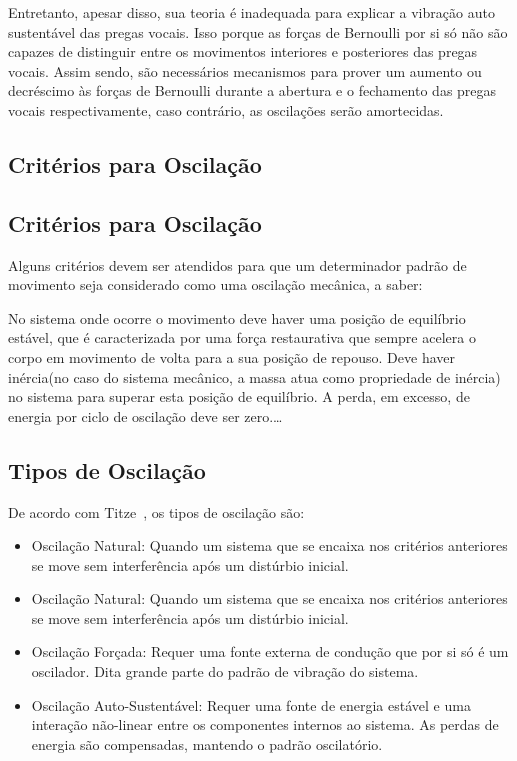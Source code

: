 	Entretanto, apesar disso, sua teoria é inadequada para explicar a vibração auto sustentável das pregas vocais. Isso porque as forças de Bernoulli por si só não são capazes de distinguir entre os movimentos interiores e posteriores das pregas vocais. Assim sendo, são necessários mecanismos para prover um aumento ou decréscimo às forças de Bernoulli durante a abertura e o fechamento das pregas vocais respectivamente, caso contrário, as oscilações serão amortecidas.
	
	\subsection{Critérios para Oscilação}
	
		\subsection{Critérios para Oscilação}
		Alguns critérios devem ser atendidos para que um determinador padrão de movimento seja considerado como uma oscilação mecânica, a saber:
		
		
		No sistema onde ocorre o movimento deve haver uma posição de equilíbrio estável, que é caracterizada por uma força restaurativa que sempre acelera o corpo em	movimento de volta para a sua posição de repouso.
		Deve haver inércia(no caso do sistema mecânico, a massa atua como propriedade de inércia) no sistema para superar esta posição de equilíbrio.
		A perda, em excesso, de energia por ciclo de oscilação deve ser zero.\ldots 
		
		\subsection{Tipos de Oscilação}
		De acordo com Titze~\cite{IngoTitze}, os tipos de oscilação são:
		\begin{itemize}
			\item  Oscilação Natural: Quando um sistema que se encaixa nos critérios anteriores se move sem interferência após um distúrbio inicial.
			\item Oscilação Natural: Quando um sistema que se encaixa nos critérios anteriores se move sem interferência após um distúrbio inicial.
			\item Oscilação Forçada: Requer uma fonte externa de condução que por si só é um
			oscilador. Dita grande parte do padrão de vibração do sistema.
			\item Oscilação Auto-Sustentável: Requer uma fonte de energia estável e uma interação não-linear entre os componentes internos ao sistema. As perdas de energia são compensadas, mantendo o padrão oscilatório.
		\end{itemize}
		
